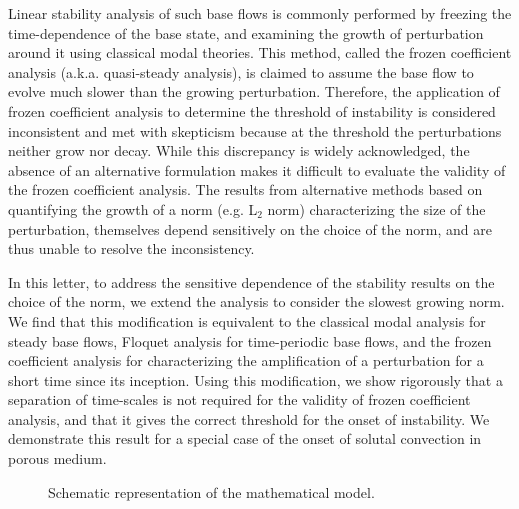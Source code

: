 \documentclass[letterpaper,10pt,prl,twocolumn,aps,reprint,superscriptaddress]{revtex4-1}
\begin{document}
Linear stability analysis of such base flows is commonly performed by freezing the time-dependence of the base state, and examining the growth of perturbation around it using classical modal theories. 
This method, called the frozen coefficient analysis (a.k.a. quasi-steady analysis), is claimed to assume the base flow to evolve much slower than the growing perturbation. 
Therefore, the application of frozen coefficient analysis to determine the threshold of instability is considered inconsistent and met with skepticism because at the threshold the perturbations neither grow nor decay. 
While this discrepancy is widely acknowledged, the absence of an alternative formulation makes it difficult to evaluate the validity of the frozen coefficient analysis. 
The results from alternative methods based on quantifying the growth of a norm (e.g. L$_2$ norm) characterizing the size of the perturbation\cite{SlimRama10}, themselves depend sensitively on the choice of the norm, and are thus unable to resolve the inconsistency.

In this letter, to address the sensitive dependence of the stability results on the choice of the norm, we extend the analysis to consider the slowest growing norm.
We find that this modification is equivalent to the classical modal analysis for steady base flows, Floquet analysis for time-periodic base flows, and the frozen coefficient analysis for characterizing the amplification of a perturbation for a short time since its inception. 
Using this modification, we show rigorously that a separation of time-scales is not required for the validity of frozen coefficient analysis, and that it gives the correct threshold for the onset of instability.
We demonstrate this result for a special case of the onset of solutal convection in porous medium.

\begin{figure}[b]
\vspace{5cm}
\caption{Schematic representation of the mathematical model.}
\label{fig:Schematic}
\end{figure}
\end{document}

